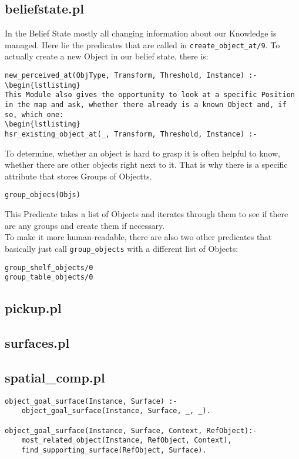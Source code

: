 \documentclass[main.tex]{subfiles}
\begin{document}
\subsection{beliefstate.pl}

In the Belief State mostly all changing information about our Knowledge is managed. Here lie the predicates that are called in \texttt{create\_object\_at/9}. To actually create a new Object in our belief state, there is:
\begin{lstlisting}
new_perceived_at(ObjType, Transform, Threshold, Instance) :-
\begin{lstlisting}
This Module also gives the opportunity to look at a specific Position in the map and ask, whether there already is a known Object and, if so, which one:
\begin{lstlisting}
hsr_existing_object_at(_, Transform, Threshold, Instance) :-
\end{lstlisting}
To determine, whether an object is hard to grasp it is often helpful to know, whether there are other objects right next to it. That is why there is a specific attribute that stores Groups of Objectts. 
\begin{lstlisting}
group_objecs(Objs)
\end{lstlisting}
This Predicate takes a list of Objects and iterates through them to see if there are any groups and create them if necessary.\\
To make it more human-readable, there are also two other predicates that basically just call \texttt{group\_objects} with a different list of Objects:
\begin{lstlisting}
group_shelf_objects/0
group_table_objects/0
\end{lstlisting}

\subsection{pickup.pl}

\subsection{surfaces.pl}

\subsection{spatial\_comp.pl}


\begin{lstlisting}
object_goal_surface(Instance, Surface) :-
    object_goal_surface(Instance, Surface, _, _).

object_goal_surface(Instance, Surface, Context, RefObject):-
    most_related_object(Instance, RefObject, Context),
    find_supporting_surface(RefObject, Surface).

\end{lstlisting}
\end{document}
